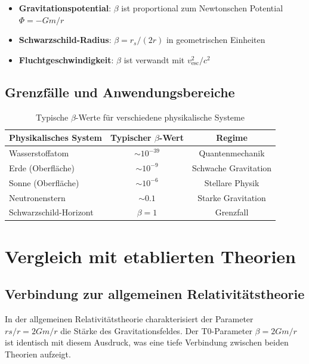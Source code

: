 	\begin{itemize}
		\item \textbf{Gravitationspotential}: $\beta$ ist proportional zum Newtonschen Potential $\Phi = -Gm/r$
		\item \textbf{Schwarzschild-Radius}: $\beta = r_s/(2r)$ in geometrischen Einheiten
		\item \textbf{Fluchtgeschwindigkeit}: $\beta$ ist verwandt mit $v_{\text{esc}}^2/c^2$
	\end{itemize}
	
	\subsection{Grenzfälle und Anwendungsbereiche}
	\label{subsec:limiting_cases}
	
	\begin{table}[htbp]
		\centering
		\begin{tabular}{lcc}
			\toprule
			\textbf{Physikalisches System} & \textbf{Typischer $\beta$-Wert} & \textbf{Regime} \\
			\midrule
			Wasserstoffatom & $\sim 10^{-39}$ & Quantenmechanik \\
			Erde (Oberfläche) & $\sim 10^{-9}$ & Schwache Gravitation \\
			Sonne (Oberfläche) & $\sim 10^{-6}$ & Stellare Physik \\
			Neutronenstern & $\sim 0.1$ & Starke Gravitation \\
			Schwarzschild-Horizont & $\beta = 1$ & Grenzfall \\
			\bottomrule
		\end{tabular}
		\caption{Typische $\beta$-Werte für verschiedene physikalische Systeme}
		\label{tab:beta_values}
	\end{table}
	
	\section{Vergleich mit etablierten Theorien}
	\label{sec:theory_comparison}
	
	\subsection{Verbindung zur allgemeinen Relativitätstheorie}
	\label{subsec:gr_connection}
	
	In der allgemeinen Relativitätstheorie charakterisiert der Parameter $rs/r = 2Gm/r$ die Stärke des Gravitationsfeldes. Der T0-Parameter $\beta = 2Gm/r$ ist identisch mit diesem Ausdruck, was eine tiefe Verbindung zwischen beiden Theorien aufzeigt.
	
